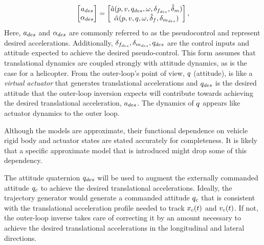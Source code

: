 \[
\begin{bmatrix}
a_{des} \\
\alpha_{des}
\end{bmatrix}
=
\begin{bmatrix}
\hat{a} (p,v,q_{des},\omega,\delta_{f_{des}},\hat{\delta}_m)\\
\hat{\alpha}(p,v,q,\omega,\hat{\delta}_f,\delta_{m_{des}})
\end{bmatrix},
\]
Here, $a_{des}$ and $\alpha_{des}$ are commonly referred to as the pseudocontrol
and represent desired accelerations. Additionally, $\delta_{f_{des}},\delta_{m_{des}},q_{des}$ are the
control inputs and attitude expected to achieve the
desired pseudo-control. This form assumes that translational
dynamics are coupled strongly with attitude dynamics, as is the case
for a helicopter. From the outer-loop's point of view, $q$
(attitude), is like a \emph{virtual actuator} that generates translational
accelerations and $q_{des}$ is the desired attitude that the
outer-loop inversion expects will contribute towards achieving the
desired translational acceleration, $a_{des}$. The dynamics of $q$
appears like actuator dynamics to the outer loop.

\begin{note}
Although the models are approximate, their functional dependence on vehicle rigid body and actuator states are stated accurately for completeness. It is likely that a specific approximate model that is introduced might drop some of this dependency.
\end{note}

\begin{note}
The attitude
quaternion $q_{des}$ will be used to augment the externally commanded
attitude $q_c$ to achieve the desired translational accelerations.  Ideally, the trajectory generator would generate a commanded attitude $q_c$ that is consistent with the translational acceleration profile needed to track $x_c(t)$ and $v_c(t)$. If not, the outer-loop inverse takes care of correcting it by an amount necessary to achieve the desired translational accelerations in the longitudinal and lateral directions.
\end{note}

